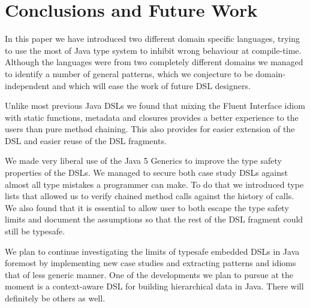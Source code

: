 \documentclass{sig-alternate}
\begin{document}
\section{Conclusions and Future Work}

In this paper we have introduced two different domain specific languages, trying to use the most of Java type system to inhibit wrong behaviour at compile-time. Although the languages were from two completely different domains we managed to identify a number of general patterns, which we conjecture to be domain-independent and which will ease the work of future DSL designers.

Unlike most previous Java DSLs we found that mixing the Fluent Interface idiom with static functions, metadata and closures provides a better experience to the users than pure method chaining. This also provides for easier extension of the DSL and easier reuse of the DSL fragments. 

We made very liberal use of the Java 5 Generics to improve the type safety properties of the DSLs. We managed to secure both case study DSLs against almost all type mistakes a programmer can make. To do that we introduced type lists that allowed us to verify chained method calls against the history of calls. We also found that it is essential to allow user to both escape the type safety limits and document the assumptions so that the rest of the DSL fragment could still be typesafe.

We plan to continue investigating the limits of typesafe embedded DSLs in Java foremost by implementing new case studies and extracting patterns and idioms that of less generic manner. One of the developments we plan to pursue at the moment is a context-aware DSL for building hierarchical data in Java. There will definitely be others as well.



\end{document}
